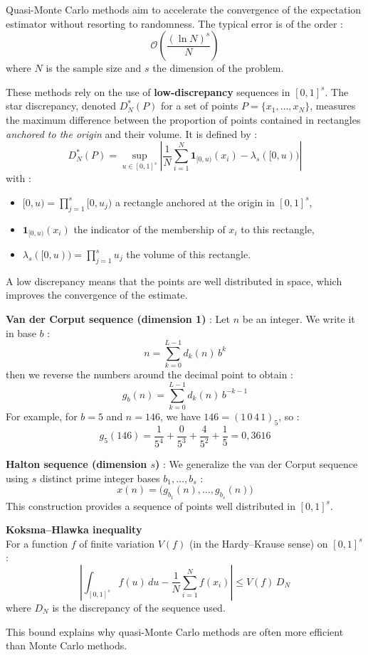 %
\begin{f}
	
	Quasi-Monte Carlo methods aim to accelerate the convergence of the expectation estimator without resorting to randomness. The typical error is of the order :
	\[
	\mathcal{O}\left( \frac{(\ln N)^s}{N} \right)
	\]
	where $N$ is the sample size and $s$ the dimension of the problem.
	
	These methods rely on the use of \textbf{low-discrepancy} sequences in $[0,1]^s$. The star discrepancy, denoted $D^*_N(P)$ for a set of points $P = \{x_1, \ldots, x_N\}$, measures the maximum difference between the proportion of points contained in rectangles \emph{anchored to the origin} and their volume. It is defined by :
	\[
	D^*_N(P) = \sup_{u \in [0,1]^s} \left| \frac{1}{N} \sum_{i=1}^N \mathbf{1}_{[0,u)}(x_i) - \lambda_s([0,u)) \right|
	\]
	with :
	\begin{itemize}
		\item $[0,u) = \prod_{j=1}^s [0, u_j)$ a rectangle anchored at the origin in $[0,1]^s$,
		\item $\mathbf{1}_{[0,u)}(x_i)$ the indicator of the membership of $x_i$ to this rectangle,
		\item $\lambda_s([0,u)) = \prod_{j=1}^s u_j$ the volume of this rectangle.
	\end{itemize}
	A low discrepancy means that the points are well distributed in space, which improves the convergence of the estimate.
	
	\medskip
	\textbf{Van der Corput sequence (dimension 1)} :
	Let $n$ be an integer. We write it in base $b$ :
	\[
	n = \sum_{k=0}^{L-1} d_k(n)\, b^k
	\]
	then we reverse the numbers around the decimal point to obtain :
	\[
	g_b(n) = \sum_{k=0}^{L-1} d_k(n)\, b^{-k-1}
	\]
	For example, for $b = 5$ and $n = 146$, we have $146 = (1\,0\,4\,1)_5$, so :
	\[
	g_5(146) = \frac{1}{5^4} + \frac{0}{5^3} + \frac{4}{5^2} + \frac{1}{5} = 0{,}3616
	\]
	
	\medskip
	\textbf{Halton sequence (dimension $s$)} :
	We generalize the van der Corput sequence using $s$ distinct prime integer bases $b_1, \dots, b_s$ :
	\[
	x(n) = \big( g_{b_1}(n), \dots, g_{b_s}(n) \big)
	\]
	This construction provides a sequence of points well distributed in $[0,1]^s$.
	
	\medskip
	\textbf{Koksma–Hlawka inequality}\\
	For a function $f$ of finite variation $V(f)$ (in the Hardy–Krause sense) on $[0,1]^s$ :
	\[
	\left| \int_{[0,1]^s} f(u)\, du - \frac{1}{N} \sum_{i=1}^N f(x_i) \right| \leq V(f)\, D_N
	\]
	where $D_N$ is the discrepancy of the sequence used.
	
This bound explains why quasi-Monte Carlo methods are often more efficient than Monte Carlo methods.
	
	
\end{f}
